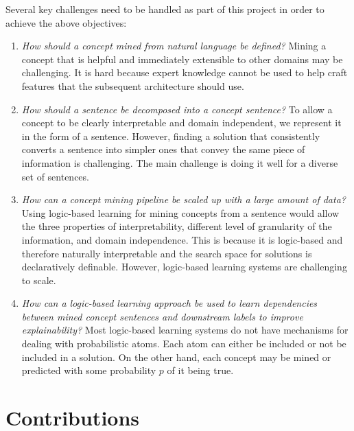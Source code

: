 Several key challenges need to be handled as part of this project in order to achieve the above objectives:
\begin{enumerate}
    \item \emph{How should a concept mined from natural language be defined?} Mining a concept that is helpful and immediately extensible to other domains may be challenging. It is hard because expert knowledge cannot be used to help craft features that the subsequent architecture should use.
    
    \item \emph{How should a sentence be decomposed into a concept sentence?} To allow a concept to be clearly interpretable and domain independent, we represent it in the form of a sentence.
    However, finding a solution that consistently converts a sentence into simpler ones that convey the same piece of information is challenging. 
    The main challenge is doing it well for a diverse set of sentences.
    
    \item \emph{How can a concept mining pipeline be scaled up with a large amount of data?} 
    Using logic-based learning for mining concepts from a sentence would allow the three properties of interpretability, different level of granularity of the information, and domain independence. 
    This is because it is logic-based and therefore naturally interpretable and the search space for solutions is declaratively definable.
    However, logic-based learning systems are challenging to scale.
    
    \item \emph{How can a logic-based learning approach be used to learn dependencies between mined concept sentences and downstream labels to improve explainability?} Most logic-based learning systems do not have mechanisms for dealing with probabilistic atoms.
    Each atom can either be included or not be included in a solution.
    On the other hand, each concept may be mined or predicted with some probability $p$ of it being true.
\end{enumerate}

 
\section{Contributions}

